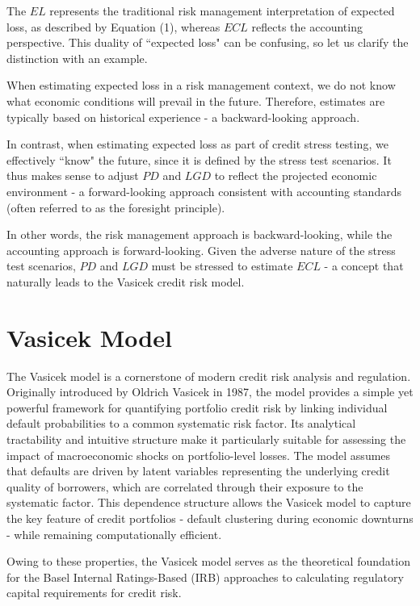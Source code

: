 \documentclass[11pt,a4paper]{article}
\begin{document}
The $EL$ represents the traditional risk management interpretation of expected loss, as described by Equation (1), whereas $ECL$ reflects the accounting perspective. This duality of ``expected loss" can be confusing, so let us clarify the distinction with an example.

When estimating expected loss in a risk management context, we do not know what economic conditions will prevail in the future. Therefore, estimates are typically based on historical experience - a backward-looking approach.

In contrast, when estimating expected loss as part of credit stress testing, we effectively ``know" the future, since it is defined by the stress test scenarios. It thus makes sense to adjust $PD$ and $LGD$ to reflect the projected economic environment - a forward-looking approach consistent with accounting standards (often referred to as the foresight principle).

In other words, the risk management approach is backward-looking, while the accounting approach is forward-looking. Given the adverse nature of the stress test scenarios, $PD$ and $LGD$ must be stressed to estimate $ECL$ - a concept that naturally leads to the Vasicek credit risk model.

\section{Vasicek Model}

The Vasicek model is a cornerstone of modern credit risk analysis and regulation. Originally introduced by Oldrich Vasicek in 1987, the model provides a simple yet powerful framework for quantifying portfolio credit risk by linking individual default probabilities to a common systematic risk factor. Its analytical tractability and intuitive structure make it particularly suitable for assessing the impact of macroeconomic shocks on portfolio-level losses. The model assumes that defaults are driven by latent variables representing the underlying credit quality of borrowers, which are correlated through their exposure to the systematic factor. This dependence structure allows the Vasicek model to capture the key feature of credit portfolios - default clustering during economic downturns - while remaining computationally efficient.

Owing to these properties, the Vasicek model serves as the theoretical foundation for the Basel Internal Ratings-Based (IRB) approaches to calculating regulatory capital requirements for credit risk.
\end{document}
